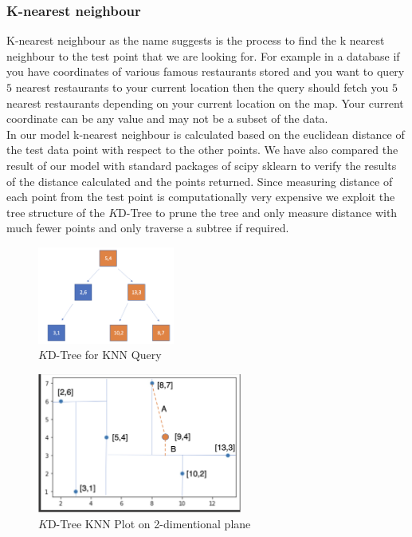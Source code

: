 \subsubsection{K-nearest neighbour}

    K-nearest neighbour as the name suggests is the process to find the k nearest neighbour to the test point that we are looking for. For example in a database if you have coordinates of various famous restaurants stored and you want to query $5$ nearest restaurants to your current location then the query should fetch you $5$ nearest restaurants depending on your current location on the map. Your current coordinate can be any value and may not be a subset of the data.\\

    In our model k-nearest neighbour is calculated based on the euclidean distance of the test data point with respect to the other points. We have also compared the result of our model with standard packages of scipy sklearn to verify the results of the distance calculated and the points returned. Since measuring distance of each point from the test point is computationally very expensive we exploit the tree structure of the $K$D-Tree to prune the tree and only measure distance with much fewer points and only traverse a subtree if required.\\

\begin{figure}[htp]
    \centering
    \includegraphics[width=0.4\textwidth]{graphs/KD-Tree_KNN_Tree.png}
    \caption{$K$D-Tree for KNN Query}
    \label{fig:$K$D-Tree_for_KNN Query}
\end{figure}

\begin{figure}[htp]
    \centering
    \includegraphics[width=0.6\textwidth]{graphs/KD-Tree_KNN_plot.png}
    \caption{$K$D-Tree KNN Plot on 2-dimentional plane}
    \label{fig:KD_Tree_KNN_Plot}
\end{figure}



